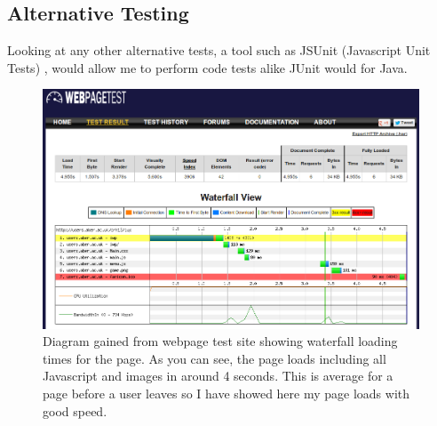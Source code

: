 \documentclass[a4paper]{article}
\begin{document}
\subsection{Alternative Testing}
Looking at any other alternative tests, a tool such as JSUnit (Javascript Unit
Tests) \cite{jsunit}, would allow me to perform code tests alike JUnit would for
Java.
   \begin{figure}[!ht]
   \centering
   \includegraphics[scale=0.5]{speed.png}
  \caption{Diagram gained from webpage test site \cite{webpagetest} showing
waterfall loading times for the page. As you can see, the page loads including
all Javascript and images in around 4 seconds. This is average for a page before
a user leaves so I have showed here my page loads with good speed.}
   \end{figure}
\end{document}
